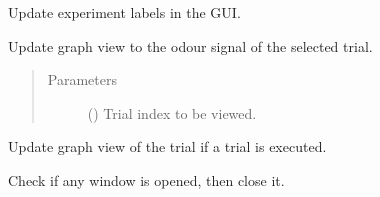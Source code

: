 \documentclass[letterpaper,10pt,english]{sphinxmanual}
\begin{document}
\begin{fulllineitems}

\begin{fulllineitems}
\label{\detokenize{NoSeMazeControl/main:main.MainApp.update_experiment_info}}
\pysigstartsignatures
{}
\pysigstopsignatures
\sphinxAtStartPar
Update experiment labels in the GUI.

\end{fulllineitems}


\begin{fulllineitems}
\label{\detokenize{NoSeMazeControl/main:main.MainApp.update_graphics_view}}
\pysigstartsignatures
{}
\pysigstopsignatures
\sphinxAtStartPar
Update graph view to the odour signal of the selected trial.
\begin{quote}\begin{description}
\item[{Parameters}] \leavevmode
\sphinxAtStartPar
{} () \textendash{} Trial index to be viewed.

\end{description}\end{quote}

\end{fulllineitems}


\begin{fulllineitems}
\label{\detokenize{NoSeMazeControl/main:main.MainApp.update_trial_view}}
\pysigstartsignatures
{}
\pysigstopsignatures
\sphinxAtStartPar
Update graph view of the trial if a trial is executed.

\end{fulllineitems}


\begin{fulllineitems}
\label{\detokenize{NoSeMazeControl/main:main.MainApp.windows_control}}
\pysigstartsignatures
{}
\pysigstopsignatures
\sphinxAtStartPar
Check if any window is opened, then close it.

\end{fulllineitems}


\end{fulllineitems}
\end{document}
